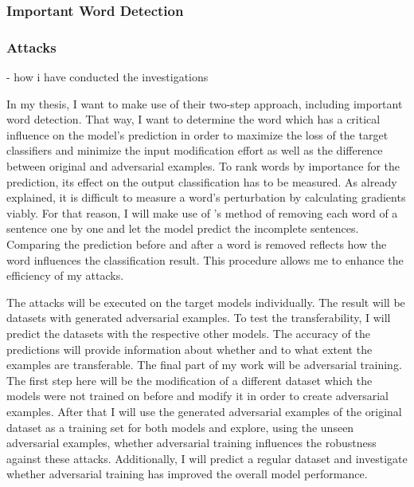 
\subsubsection{Important Word Detection} 


\subsubsection{Attacks}

- how i have conducted the investigations



In my thesis, I want to make use of their two-step approach, including important word detection. That way, I want to determine the word which has a critical influence on the model's prediction in order to maximize the loss of the target classifiers and minimize the input modification effort as well as the difference between original and adversarial examples. 
To rank words by importance for the prediction, its effect on the output classification has to be measured. As already explained, it is difficult to measure a word's perturbation by calculating gradients viably. 
For that reason, I will make use of \cite{jin2019bert}'s method of removing each word of a sentence one by one and let the model predict the incomplete sentences. 
 Comparing the prediction before and after a word is removed reflects how the word influences the classification result. This procedure allows me to enhance the efficiency of my attacks.





The attacks will be executed on the target models individually.
The result will be datasets with generated adversarial examples. To test the transferability, I will predict the datasets with the respective other models. The accuracy of the predictions will provide information about whether and to what extent the examples are transferable.
The final part of my work will be adversarial training. 
The first step here will be the modification of a different dataset which the models were not trained on before and modify it in order to create adversarial examples. After that I will use the generated adversarial examples of the original dataset as a training set for both models and explore, using the unseen adversarial examples, whether adversarial training influences the robustness against these attacks. Additionally, I will predict a regular dataset and investigate whether adversarial training has improved the overall model performance.


